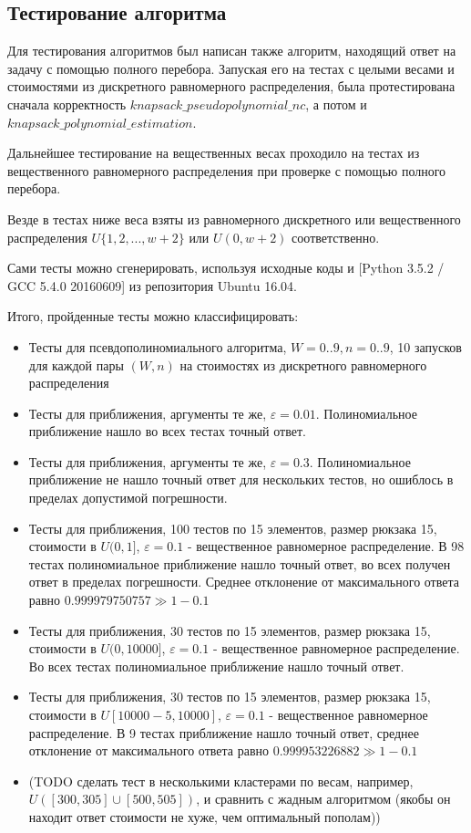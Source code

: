 \documentclass{article}
\begin{document}
	\subsection{Тестирование алгоритма}
	
	Для тестирования алгоритмов был написан также алгоритм, находящий ответ на задачу с помощью полного перебора. Запуская его на тестах с целыми весами и стоимостями из дискретного равномерного распределения, была протестирована сначала корректность $knapsack\_pseudopolynomial\_nc$, а потом и $knapsack\_polynomial\_estimation$.
	
	Дальнейшее тестирование на вещественных весах проходило на тестах из вещественного равномерного распределения при проверке с помощью полного перебора.
	
	Везде в тестах ниже веса взяты из равномерного дискретного или вещественного распределения $U\{1, 2, ..., w + 2\}$ или $U(0, w + 2)$ соответственно.
	
	Сами тесты можно сгенерировать, используя исходные коды и [Python 3.5.2 / GCC 5.4.0 20160609] из репозитория Ubuntu 16.04.
	
	Итого, пройденные тесты можно классифицировать:
	 
	\begin{itemize}
		\item Тесты для псевдополиномиального алгоритма, $W = 0..9, n = 0..9$, 10 запусков для каждой пары $(W, n)$ на стоимостях из дискретного равномерного распределения 
		\item Тесты для приближения, аргументы те же, $\varepsilon = 0.01$. Полиномиальное приближение нашло во всех тестах точный ответ.
		\item Тесты для приближения, аргументы те же, $\varepsilon = 0.3$. Полиномиальное приближение не нашло точный ответ для нескольких тестов, но ошиблось в пределах допустимой погрешности.
		\item Тесты для приближения, 100 тестов по 15 элементов, размер рюкзака 15, стоимости в $U(0, 1]$, $\varepsilon = 0.1$ - вещественное равномерное распределение. В 98 тестах полиномиальное приближение нашло точный ответ, во всех получен ответ в пределах погрешности. Среднее отклонение от максимального ответа равно  $0.999979750757 \gg 1 - 0.1$
		\item Тесты для приближения, 30 тестов по 15 элементов, размер рюкзака 15, стоимости в $U(0, 10000]$, $\varepsilon = 0.1$ - вещественное равномерное распределение. Во всех тестах полиномиальное приближение нашло точный ответ.
		\item Тесты для приближения, 30 тестов по 15 элементов, размер рюкзака 15, стоимости в $U[10000-5, 10000]$, $\varepsilon = 0.1$ - вещественное равномерное распределение. В 9 тестах приближение нашло точный ответ, среднее отклонение от максимального ответа равно $0.999953226882 \gg 1 - 0.1$
		\item (TODO сделать тест в несколькими кластерами по весам, например, $U([300, 305] \cup [500, 505])$, и сравнить с жадным алгоритмом (якобы он находит ответ стоимости не хуже, чем оптимальный пополам))
	\end{itemize}
	
\end{document}

